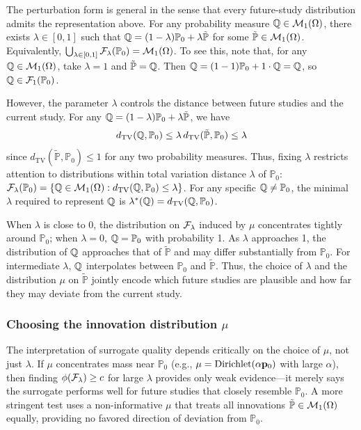 \documentclass{article}
\newcommand{\PP}{\mathbb{P}}
\begin{document}
The perturbation form is general in the sense that every future-study distribution admits the representation above. For any probability measure $\mathbb{Q} \in \mathcal{M}_1(\Omega)$, there exists $\lambda \in [0,1]$ such that $\Q = (1-\lambda)\PP_0 + \lambda\tilde{\PP}$ for some $\tilde{\PP} \in \cM_1(\Omega)$. Equivalently, $\bigcup_{\lambda \in [0,1]} \cF_\lambda(\PP_0) = \cM_1(\Omega)$.
To see this, note that, for any $\mathbb{Q} \in \mathcal{M}_1(\Omega)$, take $\lambda = 1$ and $\tilde{\PP} = \Q$. Then $\Q = (1-1)\PP_0 + 1 \cdot \Q = \Q$, so $\Q \in \cF_1(\PP_0)$.

However, the parameter $\lambda$ controls the distance between future studies and the current study. For any $\Q = (1-\lambda)\PP_0 + \lambda\tilde{\PP}$, we have
\begin{align}\label{eq:distance-bound}
    d_{\mathrm{TV}}(\Q, \PP_0) \leq \lambda \, d_{\mathrm{TV}}(\tilde{\PP}, \PP_0) \leq \lambda
\end{align}
since $d_{\mathrm{TV}}(\tilde{\PP}, \PP_0) \leq 1$ for any two probability measures. Thus, fixing $\lambda$ restricts attention to distributions within total variation distance $\lambda$ of $\PP_0$: $\cF_\lambda(\PP_0) = \{\Q \in \cM_1(\Omega) : d_{\mathrm{TV}}(\Q, \PP_0) \leq \lambda\}$. For any specific $\Q \neq \PP_0$, the minimal $\lambda$ required to represent $\mathbb{Q}$ is $\lambda^*(\Q) = d_{\mathrm{TV}}(\Q, \PP_0)$.

When $\lambda$ is close to 0, the distribution on $\mathcal{F}_\lambda$ induced by $\mu$ concentrates tightly around $\PP_0$; when $\lambda = 0$, $\Q = \PP_0$ with probability 1. As $\lambda$ approaches 1, the distribution of $\mathbb{Q}$ approaches that of $\tilde{\PP}$ and may differ substantially from $\PP_0$. For intermediate $\lambda$, $\mathbb{Q}$ interpolates between $\PP_0$ and $\tilde{\PP}$. Thus, the choice of $\lambda$ and the distribution $\mu$ on $\tilde{\PP}$ jointly encode which future studies are plausible and how far they may deviate from the current study.

\subsubsection{Choosing the innovation distribution $\mu$}

The interpretation of surrogate quality depends critically on the choice of $\mu$, not just $\lambda$. If $\mu$ concentrates mass near $\PP_0$ (e.g., $\mu = \text{Dirichlet}(\alpha \mathbf{p}_0)$ with large $\alpha$), then finding $\phi(\mathcal{F}_\lambda) \geq c$ for large $\lambda$ provides only weak evidence---it merely says the surrogate performs well for future studies that closely resemble $\PP_0$. A more stringent test uses a non-informative $\mu$ that treats all innovations $\tilde{\PP} \in \cM_1(\Omega)$ equally, providing no favored direction of deviation from $\PP_0$.
\end{document}
